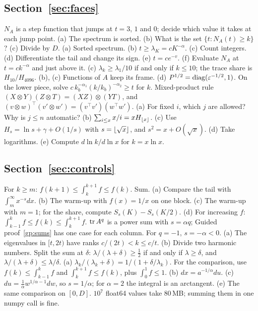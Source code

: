 \subsection*{Section~\ref{sec:faces}}
\begin{hintlist}
 $N_A$ is a step function that jumps at $t=3$, $1$ and $0$; decide which value it takes at
each jump point.
 (a) The spectrum is sorted. (b) What is the set $\{t:N_A(t)\ge k\}$? (c) Divide by $D$.
 (a) Sorted spectrum. (b) $t\ge\lambda_K=cK^{-\alpha}$. (c) Count integers. (d)
Differentiate the tail and change its sign. (e) $t=ce^{-v}$. (f) Evaluate $N_A$ at $t=ck^{-\alpha}$ and just above it.
 (c) $\lambda_k\ge\lambda_1/10$ if and only if $k\le10$; the trace share is $H_{10}/H_{4096}$.
 (b), (c) Functions of $A$ keep its frame. (d) $P^{1/2}=\operatorname{diag}(\varepsilon^{-1/2},1)$.
 On the lower piece, solve $c\,k_b^{-\alpha_1}(k/k_b)^{-\alpha_2}\ge t$ for $k$.
 Mixed-product rule $(X\otimes Y)(Z\otimes T)=(XZ)\otimes(YT)$, and
$(v\otimes w)^\top(v'\otimes w')=(v^\top v')(w^\top w')$.
 (a) For fixed $i$, which $j$ are allowed? Why is $j\le n$ automatic? (b)
$\sum_{i\le x}x/i=xH_{\lfloor x\rfloor}$. (c) Use $H_s=\ln s+\gamma+O(1/s)$ with $s=\lfloor\sqrt x\rfloor$, and $s^2=x+O(\sqrt x)$.
(d) Take logarithms. (e) Compute $d\ln k/d\ln x$ for $k=x\ln x$.

\end{hintlist}

\subsection*{Section~\ref{sec:controls}}
\begin{hintlist}
 For $k\ge m$: $f(k+1)\le\int_k^{k+1}f\le f(k)$. Sum.
 (a) Compare the tail with $\int_m^\infty x^{-s}dx$. (b) The warm-up with $f(x)=1/x$ on one
block. (c) The warm-up with $m=1$; for the share, compute $S_s(K)-S_s(K/2)$. (d) For increasing $f$:
$\int_{k-1}^kf\le f(k)\le\int_k^{k+1}f$.
 $\operatorname{tr} A^q$ is a power sum with $s=\alpha q$; Guided proof~\ref{gp:sums} has one case for each
column. For $q=-1$, $s=-\alpha<0$.
 (a) The eigenvalues in $[t,2t)$ have ranks $c/(2t)<k\le c/t$. (b) Divide two harmonic
numbers.
 Split the sum at $\delta$: $\lambda/(\lambda+\delta)\ge\frac12$ if and only if $\lambda\ge\delta$,
and $\lambda/(\lambda+\delta)\le\lambda/\delta$.
 (a) $\lambda_k/(\lambda_k+\delta)=1/(1+\delta/\lambda_k)$. For the comparison, use
$f(k)\le\int_{k-1}^kf$ and $\int_k^{k+1}f\le f(k)$, plus $\int_0^1f\le1$. (b) $dx=a^{-1/\alpha}du$. (c)
$du=\frac1\alpha w^{1/\alpha-1}dw$, so $s=1/\alpha$; for $\alpha=2$ the integral is an arctangent. (e) The same
comparison on $[0,D]$.
 $10^7$ float64 values take 80\,MB; summing them in one numpy call is fine.

\end{hintlist}

